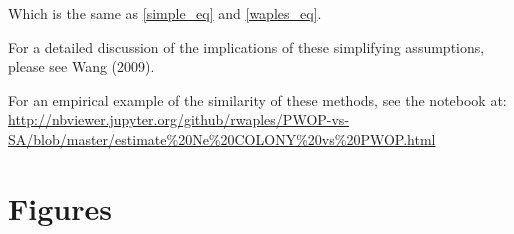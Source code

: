 \documentclass{article}
\begin{document}
\begin{description}
Which is the same as \ref{simple_eq} and \ref{waples_eq}.

For a detailed discussion of the implications of these simplifying assumptions, please see Wang (2009).







\end{description}


For an empirical example of the similarity of these methods, 
see the notebook at: \url{http://nbviewer.jupyter.org/github/rwaples/PWOP-vs-SA/blob/master/estimate%20Ne%20COLONY%20vs%20PWOP.html}



\newpage
\section*{Figures}
\end{document}
